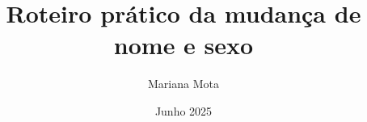 \newcommand{\DocTitle}{Roteiro prático da mudança de nome e sexo}
\newcommand{\DocSubtitle}{Um guia completo para navegar a burocracia da mudança de nome e sexo em Portugal}
\newcommand{\DocAuthor}{Mariana Mota}
\newcommand{\DocRights}{Feito com <3 para o domínio público}
\newcommand{\DocDate}{Junho 2025}
\newcommand{\DocEdition}{1ª Edição - Tema escuro}
\newcommand{\DocPublication}{Manual de instruções técnicas e práticas}
\newcommand{\DocDimensions}{A4 Standard (21×29.7 cm)}
\newcommand{\DocLanguage}{Português}
\newcommand{\DocPages}{\ztotpages}
\newcommand{\DocBanner}{imagens/banner-transgenero-preto-branco.png}
\newcommand{\DocHeader}{imagens/banner-arcoiris-2-preto-branco.png}
\newcommand{\DocFeatured}{imagens/duas-pessoas-com-fundo-psicadelico-preto-branco.png}

\title{\DocTitle}
\author{\DocAuthor}
\date{\DocDate}

